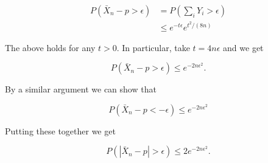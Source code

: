 \documentclass[13pt]{article}
\theoremstyle{definition}
\theoremstyle{remark}
\begin{document}
$$
\begin{aligned}
P\left(\bar{X}_{n}-p>\epsilon\right) & =P\left(\sum_{i} Y_{i}>\epsilon\right) \\
& \leq e^{-t \epsilon} e^{t^{2} /(8 n)}
\end{aligned}
$$

The above holds for any $t>0$. In particular, take $t=4 n \epsilon$ and we get

$$
P\left(\bar{X}_{n}-p>\epsilon\right) \leq e^{-2 n \epsilon^{2}} .
$$

By a similar argument we can show that

$$
P\left(\bar{X}_{n}-p<-\epsilon\right) \leq e^{-2 n \epsilon^{2}}
$$

Putting these together we get

$$
P\left(\left|\bar{X}_{n}-p\right|>\epsilon\right) \leq 2 e^{-2 n \epsilon^{2}} .
$$
\end{document}
